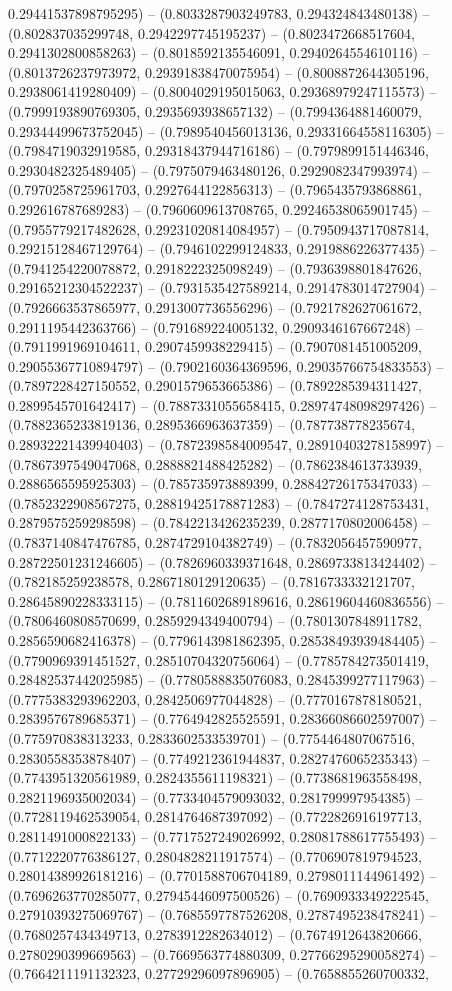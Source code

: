 0.29441537898795295) -- (0.8033287903249783, 0.294324843480138) -- (0.802837035299748, 0.2942297745195237) -- (0.8023472668517604, 0.2941302800858263) -- (0.8018592135546091, 0.2940264554610116) -- (0.8013726237973972, 0.29391838470075954) -- (0.8008872644305196, 0.2938061419280409) -- (0.8004029195015063, 0.29368979247115573) -- (0.7999193890769305, 0.2935693938657132) -- (0.7994364881460079, 0.29344499673752045) -- (0.7989540456013136, 0.29331664558116305) -- (0.7984719032919585, 0.29318437944716186) -- (0.7979899151446346, 0.2930482325489405) -- (0.7975079463480126, 0.2929082347993974) -- (0.7970258725961703, 0.2927644122856313) -- (0.7965435793868861, 0.292616787689283) -- (0.7960609613708765, 0.29246538065901745) -- (0.7955779217482628, 0.29231020814084957) -- (0.7950943717087814, 0.29215128467129764) -- (0.7946102299124833, 0.2919886226377435) -- (0.7941254220078872, 0.2918222325098249) -- (0.7936398801847626, 0.29165212304522237) -- (0.7931535427589214, 0.2914783014727904) -- (0.7926663537865977, 0.2913007736556296) -- (0.7921782627061672, 0.2911195442363766) -- (0.791689224005132, 0.2909346167667248) -- (0.7911991969104611, 0.2907459938229415) -- (0.7907081451005209, 0.29055367710894797) -- (0.7902160364369596, 0.29035766754833553) -- (0.7897228427150552, 0.2901579653665386) -- (0.7892285394311427, 0.2899545701642417) -- (0.7887331055658415, 0.28974748098297426) -- (0.7882365233819136, 0.2895366963637359) -- (0.787738778235674, 0.28932221439940403) -- (0.7872398584009547, 0.28910403278158997) -- (0.7867397549047068, 0.2888821488425282) -- (0.7862384613733939, 0.2886565595925303) -- (0.785735973889399, 0.28842726175347033) -- (0.7852322908567275, 0.28819425178871283) -- (0.7847274128753431, 0.2879575259298598) -- (0.7842213426235239, 0.2877170802006458) -- (0.7837140847476785, 0.2874729104382749) -- (0.7832056457590977, 0.28722501231246605) -- (0.7826960339371648, 0.2869733813424402) -- (0.782185259238578, 0.2867180129120635) -- (0.7816733332121707, 0.28645890228333115) -- (0.7811602689189616, 0.28619604460836556) -- (0.7806460808570699, 0.2859294349400794) -- (0.7801307848911782, 0.2856590682416378) -- (0.7796143981862395, 0.28538493939484405) -- (0.7790969391451527, 0.28510704320756064) -- (0.7785784273501419, 0.28482537442025985) -- (0.7780588835076083, 0.2845399277117963) -- (0.7775383293962203, 0.2842506977044828) -- (0.7770167878180521, 0.2839576789685371) -- (0.7764942825525591, 0.28366086602597007) -- (0.775970838313233, 0.2833602533539701) -- (0.7754464807067516, 0.2830558353878407) -- (0.7749212361944837, 0.2827476065235343) -- (0.7743951320561989, 0.2824355611198321) -- (0.7738681963558498, 0.2821196935002034) -- (0.7733404579093032, 0.281799997954385) -- (0.7728119462539054, 0.2814764687397092) -- (0.7722826916197713, 0.2811491000822133) -- (0.7717527249026992, 0.28081788617755493) -- (0.7712220776386127, 0.2804828211917574) -- (0.7706907819794523, 0.28014389926181216) -- (0.7701588706704189, 0.2798011144961492) -- (0.7696263770285077, 0.27945446097500526) -- (0.7690933349222545, 0.27910393275069767) -- (0.7685597787526208, 0.2787495238478241) -- (0.7680257434349713, 0.2783912282634012) -- (0.7674912643820666, 0.2780290399669563) -- (0.7669563774880309, 0.27766295290058274) -- (0.7664211191132323, 0.27729296097896905) -- (0.7658855260700332, 